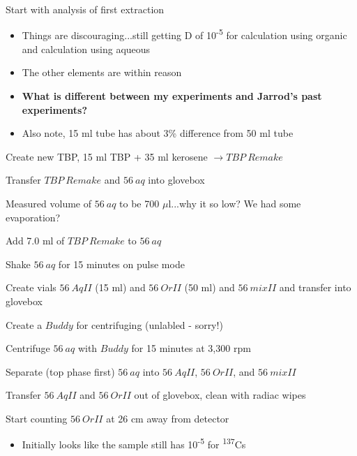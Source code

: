 \documentclass[idxtotoc,hyperref,openany,oneside]{labbook} %
\newcommand{\cmark}{\ding{51}}%
\newcommand{\done}{\rlap{$\square$}{\raisebox{2pt}{\large\hspace{1pt}\cmark}}%
  \hspace{-2.5pt}}
\newcommand{\tss}{\textsuperscript}
\begin{document}
\begin{todolist}
\item{Start with analysis of first extraction}
  \begin{itemize}
  \item{Things are discouraging...still getting D of 10\tss{-5} for
    calculation using organic and calculation using aqueous}
  \item{The other elements are within reason}
  \item{\textbf{What is different between my experiments and Jarrod's past experiments?}}
  \item{Also note, 15 ml tube has about 3\% difference from 50 ml tube}
  \end{itemize}
\item[\done]{Create new TBP, 15 ml TBP + 35 ml kerosene $\rightarrow\boxed{TBP\ Remake}$}
\item[\done]{Transfer $\boxed{TBP\ Remake}$ and $\boxed{56\ aq}$ into glovebox}
\item[\done]{Measured volume of $\boxed{56\ aq}$ to be 700 $\mu$l...why
  it so low? We had some evaporation?}
\item[\done]{Add 7.0 ml of $\boxed{TBP\ Remake}$ to $\boxed{56\ aq}$}
\item[\done]{Shake $\boxed{56\ aq}$ for 15 minutes on pulse mode}
\item[\done]{Create vials $\boxed{56\ AqII}$ (15 ml) and $\boxed{56\ OrII}$ (50 ml) and $\boxed{56\ mixII}$
  and transfer into glovebox}
\item[\done]{Create a $\boxed{Buddy}$ for centrifuging (unlabled - sorry!)}
\item[\done]{Centrifuge $\boxed{56\ aq}$ with $\boxed{Buddy}$ for 15 minutes at 3,300 rpm}
\item[\done]{Separate (top phase first) $\boxed{56\ aq}$ into $\boxed{56\ AqII}$, $\boxed{56\ OrII}$,
  and $\boxed{56\ mixII}$}
\item[\done]{Transfer $\boxed{56\ AqII}$ and $\boxed{56\ OrII}$ out of glovebox,
  clean with radiac wipes}
\item[\done]{Start counting $\boxed{56\ OrII}$ at 26 cm away from detector}
  \begin{itemize}
  \item{Initially looks like the sample still has 10\tss{-5} for \tss{137}Cs}
  \end{itemize}
\end{todolist}
\end{document}
